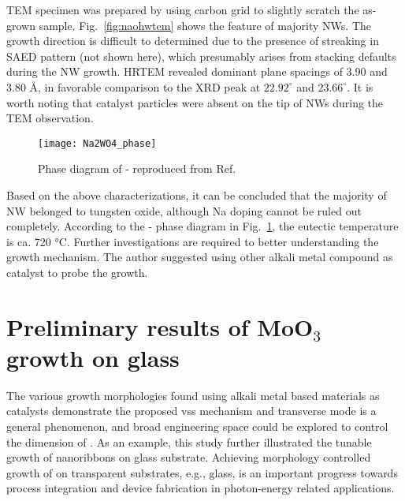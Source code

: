 TEM specimen was prepared by using carbon grid to slightly scratch the as-grown sample. Fig.~\ref{fig:naohwtem} shows the feature of majority NWs. The growth direction is difficult to determined due to the presence of streaking in SAED pattern (not shown here), which presumably arises from stacking defaults during the NW growth. HRTEM revealed dominant plane spacings of 3.90 and 3.80 \si{\angstrom}, in favorable comparison to the XRD peak at $22.92^\circ$ and $23.66^\circ$. It is worth noting that catalyst particles were absent on the tip of NWs during the TEM observation. 
\begin{figure}[htb]
\centering
\texttt{[image: Na2WO4\_phase]}
\caption[Phase diagram of -]{Phase diagram of - reproduced from Ref.~\cite{Hoermann1929}}
\label{fig:nawopd}
\end{figure}
Based on the above characterizations, it can be concluded that the majority of NW belonged to tungsten oxide, although Na doping cannot be ruled out completely. According to the - phase diagram in Fig.~\ref{fig:nawopd}, the eutectic temperature is ca. 720 \si{\degreeCelsius}.\cite{Mann2007} Further investigations are required to better understanding the growth mechanism. The author suggested using other alkali metal compound as catalyst to probe the  growth. 


\section{Preliminary results of MoO$_3$ growth on glass}\label{sec:mogls}

The various growth morphologies found using alkali metal based materials as catalysts demonstrate the proposed \gls{vss} mechanism and transverse mode is a general phenomenon, and broad engineering space could be explored to control the dimension of . As an example, this study further illustrated the tunable growth of  nanoribbons on glass substrate. Achieving morphology controlled growth of  on transparent substrates, e.g., glass, is an important progress towards process integration and device fabrication in photon-energy related applications. 

